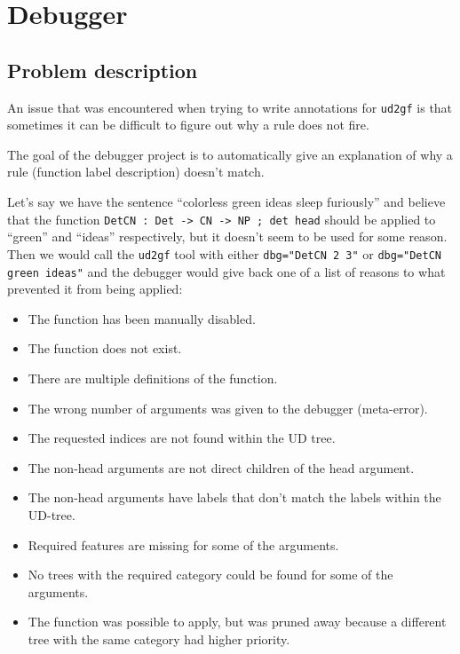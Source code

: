 \chapter{Debugger}

\section{Problem description}

An issue that was encountered when trying to write annotations for \texttt{ud2gf} is that sometimes it can be difficult to figure out why a rule does not fire.

The goal of the debugger project is to automatically give an explanation of why a rule (function label description) doesn't match.




Let's say we have the sentence ``colorless green ideas sleep furiously'' and believe that the function \verb|DetCN : Det -> CN -> NP ; det head| should be applied to ``green'' and ``ideas'' respectively, but it doesn't seem to be
used for some reason. Then we would call the \texttt{ud2gf} tool with either \verb|dbg="DetCN 2 3"| or \verb|dbg="DetCN green ideas"| and the debugger would give back one of a list of reasons to what prevented it from being applied:

\begin{itemize}
    \item The function has been manually disabled.
    \item The function does not exist.
    \item There are multiple definitions of the function.
    \item The wrong number of arguments was given to the debugger (meta-error).
    \item The requested indices are not found within the UD tree.
    \item The non-head arguments are not direct children of the head argument.
    \item The non-head arguments have labels that don't match the labels within the UD-tree.
    \item Required features are missing for some of the arguments.
    \item No trees with the required category could be found for some of the arguments.
    \item The function was possible to apply, but was pruned away because a different tree with the same category had higher priority.
\end{itemize}

